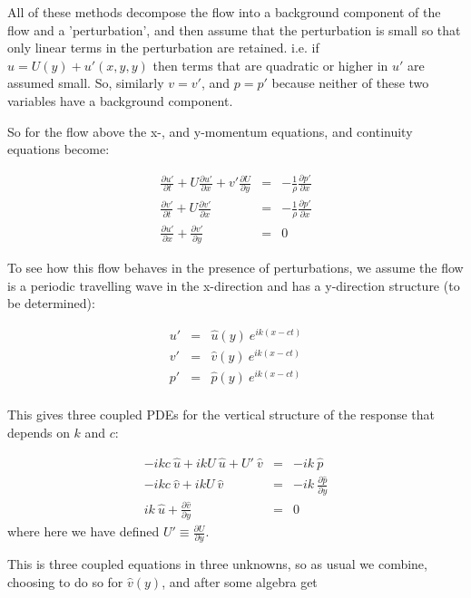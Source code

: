 \documentclass[11pt]{article}
\begin{document}
All of these methods decompose the flow into a background component of the flow
and a 'perturbation', and then assume that the perturbation is small so that
only linear terms in the perturbation are retained.  i.e. if $u = U(y) + u'(x,
y, y)$ then terms that are quadratic or higher in $u'$ are assumed small.   So,
similarly $v=v'$, and $p=p'$ because neither of these two variables have a
background component. 

So for the flow above the x-, and y-momentum equations, and continuity
equations become:

\begin{eqnarray*}
  \frac{\partial u'}{\partial t} + U\frac{\partial u'}{\partial x} +
v'\frac{\partial U}{\partial y} & = & - \frac{1}{\rho}\frac{\partial
p'}{\partial x} \\
  \frac{\partial v'}{\partial t} + U\frac{\partial v'}{\partial x} & = & -
\frac{1}{\rho}\frac{\partial p'}{\partial x}\\
  \frac{\partial u'}{\partial x} + \frac{\partial v'}{\partial y} & = & 0
\end{eqnarray*}

To see how this flow behaves in the presence of perturbations, we assume the
flow is a periodic travelling wave in the x-direction and has a y-direction
structure (to be determined):

\begin{eqnarray*}
  u' &= &\hat{u}(y)\ e^{i k (x -ct)}\\
  v' &= &\hat{v}(y)\ e^{i k (x -ct)}\\
  p' &= &\hat{p}(y)\ e^{i k (x -ct)}\\
\end{eqnarray*}

This gives three coupled PDEs for the vertical structure of the response that
depends on $k$ and $c$:

\begin{eqnarray*}
-ikc\ \hat{u} + ik U\ \hat{u} + U'\ \hat{v} & = & -ik\ \hat{p}\\
-ikc\ \hat{v} + ik U\ \hat{v}  & = & -ik\ \frac{\partial \hat{p}}{\partial y}\\
ik\ \hat{u} + \frac{\partial \hat{v}}{\partial y} & = & 0
\end{eqnarray*}
where here we have defined $U' \equiv \frac{\partial U}{\partial y}$.

This is three coupled equations in three unknowns, so as usual we combine,
choosing to do so for $\hat{v}(y)$, and after some algebra get
\end{document}
